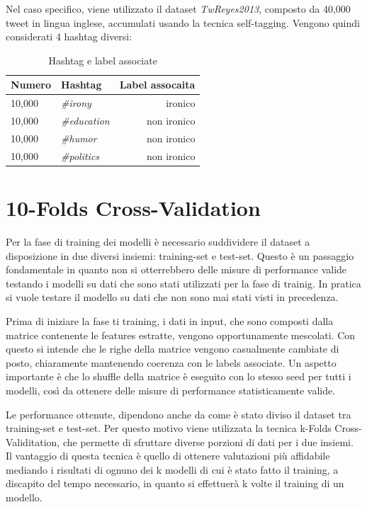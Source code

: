 \documentclass[oneside]{book}
\begin{document}
Nel caso specifico, viene utilizzato il dataset \emph{TwReyes2013}, composto da 40,000 tweet in lingua inglese, accumulati usando la tecnica self-tagging. Vengono quindi considerati 4 hashtag diversi:


\begin{table}[ht]
	\centering
	\begin{tabular}[t]{llr}
		\hline
		\textbf{Numero} & \textbf{Hashtag}  & \textbf{Label assocaita}\\
		\hline
		10,000 & \emph{\#irony}     & ironico     \\
		10,000 & \emph{\#education} & non ironico \\
		10,000 & \emph{\#humor}     & non ironico \\
		10,000 & \emph{\#politics}  & non ironico \\
		\hline
	\end{tabular}
	\caption{Hashtag e label associate}
\end{table}%

\section{10-Folds Cross-Validation}
Per la fase di training dei modelli è necessario suddividere il dataset a disposizione in due diversi insiemi: training-set e test-set. Questo è un passaggio fondamentale in quanto non si otterrebbero delle misure di performance valide testando i modelli su dati che sono stati utilizzati per la fase di trainig. In pratica si vuole testare il modello su dati che non sono mai stati visti in precedenza.

Prima di iniziare la fase ti training, i dati in input, che sono composti dalla matrice contenente le features estratte, vengono opportunamente mescolati. Con questo si intende che le righe della matrice vengono casualmente cambiate di posto, chiaramente mantenendo coerenza con le labels associate. Un aspetto importante è che lo shuffle della matrice è eseguito con lo stesso seed per tutti i modelli, così da ottenere delle misure di performance statisticamente valide.

Le performance ottenute, dipendono anche da come è stato diviso il dataset tra training-set e test-set. Per questo motivo viene utilizzata la tecnica k-Folds Cross-Validitation, che permette di sfruttare diverse porzioni di dati per i due insiemi. Il vantaggio di questa tecnica è quello di ottenere valutazioni più affidabile mediando i risultati di ognuno dei k modelli di cui è stato fatto il training, a discapito del tempo necessario, in quanto si effettuerà k volte il training di un modello.
\end{document}
